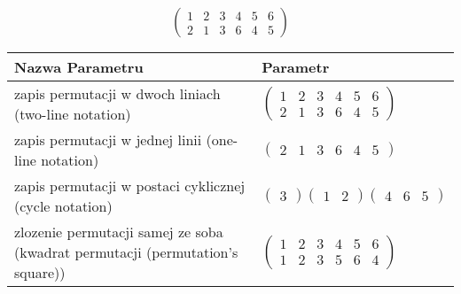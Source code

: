 \documentclass[12pt]{article}
\begin{document}
\subsection{}
\begin{center}
\[
\begin{pmatrix}
	1 & 2 & 3 & 4 & 5 & 6 \\ 
	2 & 1 & 3 & 6 & 4 & 5 
\end{pmatrix}
\]

\begin{tabular}{|m{0.6\linewidth}|m{0.4\linewidth}|}
	\hline
	Nazwa Parametru & Parametr \\
	\hline
	zapis permutacji w dwoch liniach (two-line notation) & $\begin{pmatrix} 1 & 2 & 3 & 4 & 5 & 6 \\ 
2 & 1 & 3 & 6 & 4 & 5 \end{pmatrix}$ \\ 
	\hline
	zapis permutacji w jednej linii (one-line notation) & $\begin{pmatrix} 2 & 1 & 3 & 6 & 4 & 5 \end{pmatrix}$ \\ 
	\hline
	zapis permutacji w postaci cyklicznej (cycle notation) & $\begin{pmatrix} 3 \end{pmatrix} \begin{pmatrix} 1 & 2 \end{pmatrix} \begin{pmatrix} 4 & 6 & 5 \end{pmatrix} $ \\ 
	\hline
	zlozenie permutacji samej ze soba (kwadrat permutacji (permutation's square)) & $\begin{pmatrix} 1 & 2 & 3 & 4 & 5 & 6 \\ 
1 & 2 & 3 & 5 & 6 & 4 \end{pmatrix}$ \\ 
	\hline
\end{tabular}
\end{center}
\end{document}
